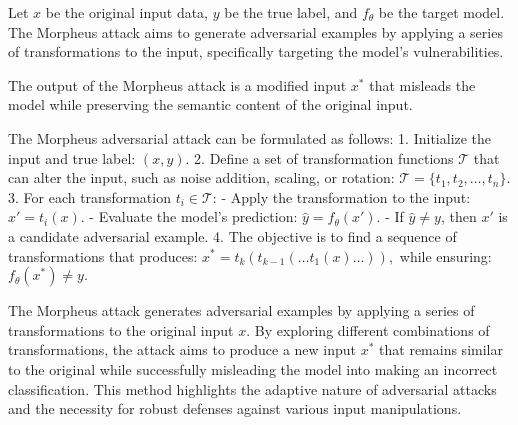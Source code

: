 Let \( x \) be the original input data, \( y \) be the true label, and \( f_{\theta} \) be the target model. The Morpheus attack aims to generate adversarial examples by applying a series of transformations to the input, specifically targeting the model's vulnerabilities.

The output of the Morpheus attack is a modified input \( x^* \) that misleads the model while preserving the semantic content of the original input.

The Morpheus adversarial attack can be formulated as follows:
1. Initialize the input and true label:
   $
   (x, y).
   $
2. Define a set of transformation functions \( \mathcal{T} \) that can alter the input, such as noise addition, scaling, or rotation:
   $
   \mathcal{T} = \{t_1, t_2, \ldots, t_n\}.
   $
3. For each transformation \( t_i \in \mathcal{T} \):
   - Apply the transformation to the input:
   $
   x' = t_i(x).
   $
   - Evaluate the model's prediction:
   $
   \hat{y} = f_{\theta}(x').
   $
   - If \( \hat{y} \neq y \), then \( x' \) is a candidate adversarial example.
4. The objective is to find a sequence of transformations that produces:
   $
   x^* = t_k(t_{k-1}(\ldots t_1(x) \ldots)),
   $
   while ensuring:
   $
   f_{\theta}(x^*) \neq y.
   $

The Morpheus attack generates adversarial examples by applying a series of transformations to the original input \( x \). By exploring different combinations of transformations, the attack aims to produce a new input \( x^* \) that remains similar to the original while successfully misleading the model into making an incorrect classification. This method highlights the adaptive nature of adversarial attacks and the necessity for robust defenses against various input manipulations.
